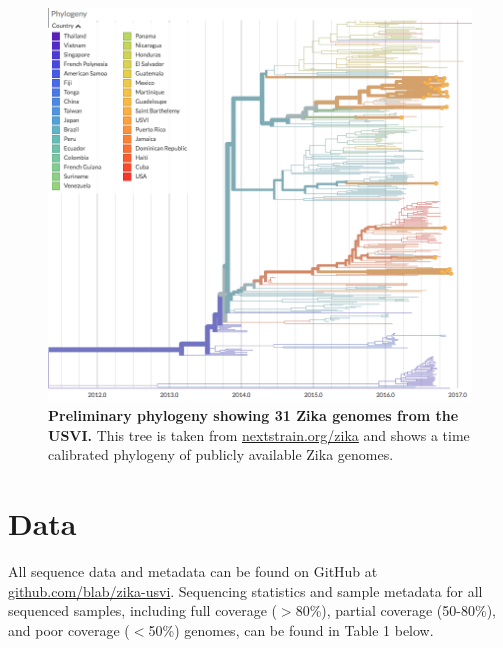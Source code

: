 \documentclass[11pt,oneside,letterpaper]{article}
\begin{document}
\begin{figure}[H]
	\centering
	\includegraphics[width=1.0\textwidth]{figures/zika_usvi_tree}
	\caption{\textbf{Preliminary phylogeny showing 31 Zika genomes from the USVI.}
	This tree is taken from \href{https://nextstrain.org/zika}{nextstrain.org/zika} and shows a time calibrated phylogeny of publicly available Zika genomes.
	}
	\label{zika_usvi_tree}
\end{figure}

\section*{Data}

All sequence data and metadata can be found on GitHub at \href{https://github.com/blab/zika-usvi}{github.com/blab/zika-usvi}. Sequencing statistics and sample metadata for all sequenced samples, including full coverage ($>$80\%), partial coverage (50-80\%), and poor coverage ($<$50\%) genomes, can be found in Table 1 below.
\end{document}
